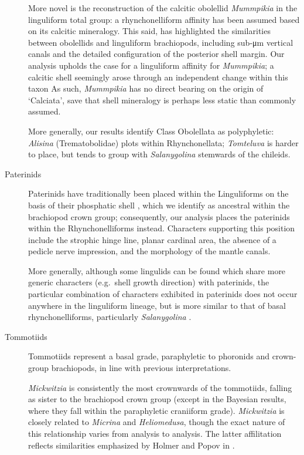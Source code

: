 \documentclass[openany]{book}
\begin{document}
\begin{description}
More novel is the reconstruction of the calcitic obolellid
\emph{Mummpikia} in the linguliform total group: a rhynchonelliform
affinity has been assumed based on its calcitic mineralogy. This said,
\citet{Balthasar2008iMummpikia} has highlighted the similarities between
obolellids and linguliform brachiopods, including sub-μm vertical canals
and the detailed configuration of the posterior shell margin. Our
analysis upholds the case for a linguliform affinity for
\emph{Mummpikia}; a calcitic shell seemingly arose through an
independent change within this taxon As such, \emph{Mummpikia} has no
direct bearing on the origin of `Calciata', save that shell mineralogy
is perhaps less static than commonly assumed.

More generally, our results identify Class Obolellata as polyphyletic:
\emph{Alisina} (Trematobolidae) plots within Rhynchonellata;
\emph{Tomteluva} is harder to place, but tends to group with
\emph{Salanygolina} stemwards of the chileids.
\item[Paterinids]
Paterinids have traditionally been placed within the Linguliforms on the
basis of their phosphatic shell \citep{Williams2007Supplement}, which we
identify as ancestral within the brachiopod crown group; consequently,
our analysis places the paterinids within the Rhynchonelliforms instead.
Characters supporting this position include the strophic hinge line,
planar cardinal area, the absence of a pedicle nerve impression, and the
morphology of the mantle canals.

More generally, although some lingulids can be found which share more
generic characters (e.g.~shell growth direction) with paterinids, the
particular combination of characters exhibited in paterinids does not
occur anywhere in the linguliform lineage, but is more similar to that
of basal rhynchonelliforms, particularly \emph{Salanygolina} \citep[as
noted by][]{Holmer2009Theenigmatic}.
\item[Tommotiids]
Tommotiids represent a basal grade, paraphyletic to phoronids and
crown-group brachiopods, in line with previous interpretations.

\emph{Mickwitzia} is consistently the most crownwards of the tommotiids,
falling as sister to the brachiopod crown group (except in the Bayesian
results, where they fall within the paraphyletic craniiform grade).
\emph{Mickwitzia} is closely related to \emph{Micrina} and
\emph{Heliomedusa}, though the exact nature of this relationship varies
from analysis to analysis. The latter affilitation reflects similarities
emphasized by Holmer and Popov in \citet{Williams2007Supplement}.


\end{description}
\end{document}

